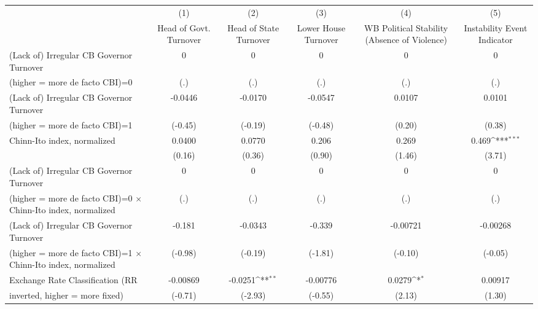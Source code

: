 {
\def\sym#1{\ifmmode^{#1}\else\(^{#1}\)\fi}
\begin{tabular}{l*{5}{c}}
\toprule
                                        &\multicolumn{1}{c}{(1)}&\multicolumn{1}{c}{(2)}&\multicolumn{1}{c}{(3)}&\multicolumn{1}{c}{(4)}&\multicolumn{1}{c}{(5)}\\
                                        &\multicolumn{1}{c}{Head of Govt. Turnover}&\multicolumn{1}{c}{Head of State Turnover}&\multicolumn{1}{c}{Lower House Turnover}&\multicolumn{1}{c}{WB Political Stability (Absence of Violence)}&\multicolumn{1}{c}{Instability Event Indicator}\\
\midrule
(Lack of) Irregular CB Governor Turnover&    0         &    0         &    0         &    0         &    0         \\
(higher = more de facto CBI)=0          &  (.)         &  (.)         &  (.)         &  (.)         &  (.)         \\
\addlinespace
(Lack of) Irregular CB Governor Turnover&-0.0446         &-0.0170         &-0.0547         &0.0107         &0.0101         \\
(higher = more de facto CBI)=1          &(-0.45)         &(-0.19)         &(-0.48)         &(0.20)         &(0.38)         \\
\addlinespace
Chinn-Ito index, normalized             &0.0400         &0.0770         &0.206         &0.269         &0.469\sym{***}\\
                                        &(0.16)         &(0.36)         &(0.90)         &(1.46)         &(3.71)         \\
\addlinespace
(Lack of) Irregular CB Governor Turnover&    0         &    0         &    0         &    0         &    0         \\
(higher = more de facto CBI)=0 $\times$ Chinn-Ito index, normalized&  (.)         &  (.)         &  (.)         &  (.)         &  (.)         \\
\addlinespace
(Lack of) Irregular CB Governor Turnover&-0.181         &-0.0343         &-0.339         &-0.00721         &-0.00268         \\
(higher = more de facto CBI)=1 $\times$ Chinn-Ito index, normalized&(-0.98)         &(-0.19)         &(-1.81)         &(-0.10)         &(-0.05)         \\
\addlinespace
Exchange Rate Classification (RR        &-0.00869         &-0.0251\sym{**} &-0.00776         &0.0279\sym{*}  &0.00917         \\
inverted, higher = more fixed)          &(-0.71)         &(-2.93)         &(-0.55)         &(2.13)         &(1.30)         \\

\end{tabular}}
